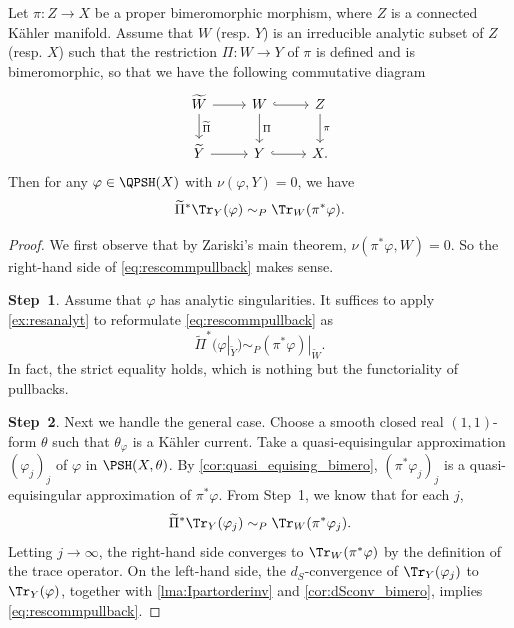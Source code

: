 \begin{lemma}\label{lma:rescommpullback}
    Let $\pi\colon Z\rightarrow X$ be a proper bimeromorphic morphism, where $Z$ is a connected Kähler manifold. Assume that $W$ (resp. $Y$) is an irreducible analytic subset of $Z$ (resp. $X$) such that the restriction $\Pi \colon W\rightarrow Y$ of $\pi$ is defined and is bimeromorphic, so that we have the following commutative diagram
    \[
    \begin{tikzcd}
        \widetilde{W}\arrow[r]\arrow[d,"\widetilde{\Pi}"] & W \arrow[d, "\Pi"] \arrow[r, hook] & Z \arrow[d, "\pi"] \\
        \widetilde{Y}\arrow[r] & Y \arrow[r, hook]                  & X.
\end{tikzcd}
    \]
    Then for any $\varphi\in \QPSH(X)$ with $\nu(\varphi,Y)=0$, we have
\begin{equation}\label{eq:rescommpullback}
    \widetilde{\Pi}^*\Tr_{Y}(\varphi)\sim_P\Tr_W(\pi^*\varphi).
    \end{equation}
\end{lemma}
\begin{proof}
We first observe that by Zariski's main theorem, $\nu(\pi^*\varphi,W)=0$. So the right-hand side of \eqref{eq:rescommpullback} makes sense.

\textbf{Step~1}.
    Assume that $\varphi$ has analytic singularities.
    It suffices to apply \cref{ex:resanalyt} to reformulate \eqref{eq:rescommpullback} as
    \[
    \widetilde{\Pi}^*(\varphi|_{\widetilde{Y}})\sim_P(\pi^*\varphi)|_{\widetilde{W}}.
    \]
    In fact, the strict equality holds, which is nothing but the functoriality of pullbacks.

\textbf{Step~2}.
    Next we handle the general case. Choose a smooth closed real $(1,1)$-form $\theta$ such that $\theta_{\varphi}$ is a Kähler current. Take a quasi-equisingular approximation $(\varphi_j)_j$ of $\varphi$ in $\PSH(X,\theta)$. By \cref{cor:quasi_equising_bimero}, $(\pi^*\varphi_j)_j$ is a quasi-equisingular approximation of $\pi^*\varphi$.
    From Step~1, we know that for each $j$,
    \[
    \widetilde{\Pi}^*\Tr_{Y}(\varphi_j)\sim_P\Tr_W(\pi^*\varphi_j).
    \]
    Letting $j\to\infty$, the right-hand side converges to $\Tr_W(\pi^*\varphi)$ by the definition of the trace operator. On the left-hand side, the $d_S$-convergence of $\Tr_Y(\varphi_j)$ to $\Tr_Y(\varphi)$, together with \cref{lma:Ipartorderinv} and \cref{cor:dSconv_bimero}, implies \eqref{eq:rescommpullback}.
\end{proof}


